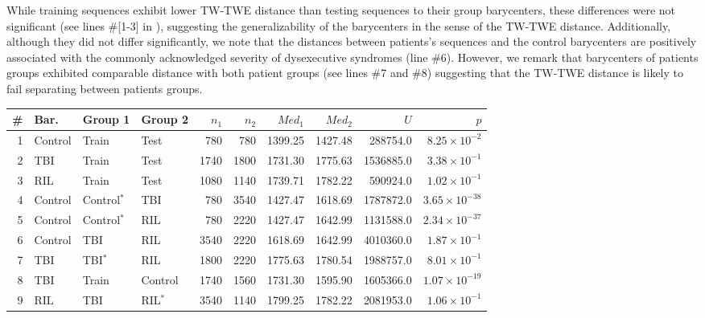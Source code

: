 \begin{chapterabstract}
        While training sequences exhibit lower TW-TWE distance than testing sequences to their group barycenters, these differences were not significant (see lines \#[1-3] in ), suggesting the generalizability of the barycenters in the sense of the TW-TWE distance. Additionally, although they did not differ significantly, we note that the distances between patients's sequences and the control barycenters are positively associated with the commonly acknowledged severity of dysexecutive syndromes (line \#6). %
        However, we remark that barycenters of patients groups exhibited comparable distance with both patient groups (see lines \#7 and \#8) suggesting that the TW-TWE distance is likely to fail separating between patients groups. 
        
        \begin{table}[htbp]
            \small
            \setlength{\tabcolsep}{4pt}
            \begin{tabular}{r l l l r r r r r r}
            \toprule
            \# & \textbf{Bar.} & \textbf{Group 1} & \textbf{Group 2} & $n_1$ & $n_2$ & $Med_{1}$ & $Med_{2}$ & $U$ & $p$ \\
            \midrule
            1 & Control & Train & Test & 780  & 780  & 1399.25 & 1427.48 & 288754.0  & $8.25\times10^{-2}$ \\
            2 & TBI& Train & Test& 1740 & 1800 & 1731.30 & 1775.63 & 1536885.0 & $3.38\times10^{-1}$ \\
            3 & RIL& Train & Test & 1080 & 1140 & 1739.71 & 1782.22 & 590924.0  & $1.02\times10^{-1}$ \\
            4 & Control & Control$^*$ & TBI & 780 & 3540 & 1427.47 & 1618.69 & 1787872.0 & $3.65\times10^{-38}$ \\
            5 & Control & Control$^*$ & RIL& 780 & 2220 & 1427.47 & 1642.99 & 1131588.0 & $2.34\times10^{-37}$ \\
            6 & Control & TBI & RIL  & 3540 & 2220 & 1618.69 & 1642.99 & 4010360.0 & $1.87\times10^{-1}$ \\
            7 & TBI & TBI$^*$ & RIL& 1800 & 2220 & 1775.63 & 1780.54 & 1988757.0 & $8.01\times10^{-1}$ \\
            8 & TBI  & Train & Control & 1740 & 1560 & 1731.30 & 1595.90 & 1605366.0 & $1.07\times10^{-19}$ \\
            9 & RIL & TBI  & RIL$^*$ & 3540 & 1140 & 1799.25 & 1782.22 & 2081953.0 & $1.06\times10^{-1}$ \\

\end{tabular}
\end{table}
\end{chapterabstract}
